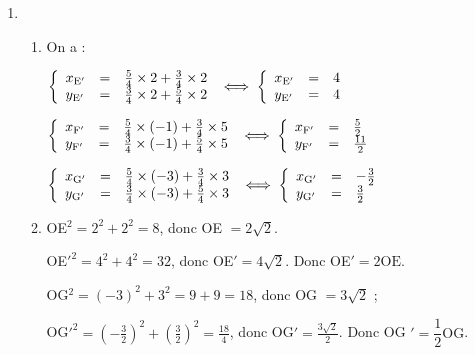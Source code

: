 \documentclass[10pt]{article}
\begin{document}
\begin{enumerate}
\item 
	\begin{enumerate}
		\item %
On a :

$\left\{\begin{array}{l c l}
x_{\text{E}'}&=&\frac{5}{4}\times 2 + \frac{3}{4}\times 2\\
y_{\text{E}'}&=&\frac{3}{4}\times 2 + \frac{5}{4}\times 2\\
\end{array}\right. \iff \left\{\begin{array}{l c l}
x_{\text{E}'}&=& 4\\
y_{\text{E}'}&=&4
\end{array}\right.$

$\left\{\begin{array}{l c l}
x_{\text{F}'}&=&\frac{5}{4}\times (- 1) + \frac{3}{4}\times 5\\
y_{\text{F}'}&=&\frac{3}{4}\times (- 1) + \frac{5}{4}\times 5\\
\end{array}\right. \iff \left\{\begin{array}{l c l}
x_{\text{F}'}&=& \frac{5}{2}\\
y_{\text{F}'}&=&\frac{11}{2}
\end{array}\right.$

$\left\{\begin{array}{l c l}
x_{\text{G}'}&=&\frac{5}{4}\times (- 3) + \frac{3}{4}\times 3\\
y_{\text{G}'}&=&\frac{3}{4}\times (- 3) + \frac{5}{4}\times 3\\
\end{array}\right. \iff \left\{\begin{array}{l c l}
x_{\text{G}'}&=&- \frac{3}{2}\\
y_{\text{G}'}&=&\frac{3}{2}
\end{array}\right.$
		\item %
OE$^2 = 2^2 + 2^2 = 8$, donc OE $ = 2\sqrt{2}$.

OE$'^2 	 = 4^2 + 4^2 = 32$, donc OE$' = 4\sqrt{2}$. Donc OE$' = 2 \text{OE}$.

OG$^2 = (- 3)^2 + 3^2 = 9 + 9 = 18$, donc OG $ = 3\sqrt{2}$ ;

OG$'^2 = \left(- \frac{3}{2} \right)^2 + \left(\frac{3}{2} \right)^2 = \frac{18}{4}$, donc OG$' = \frac{3\sqrt{2}}{2}$. Donc OG
$' = \dfrac{1}{2}\text{OG}$.
	 

\end{enumerate}
\end{enumerate}
\end{document}
